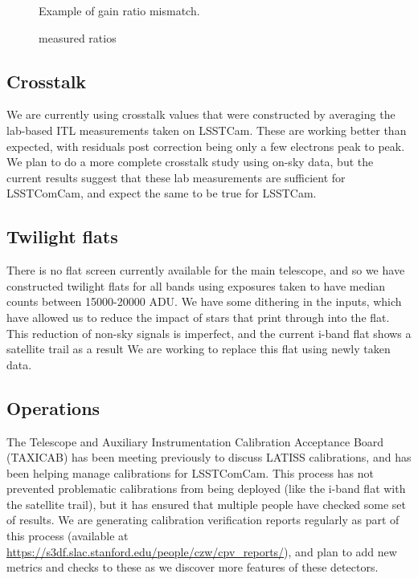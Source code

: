 \begin{figure}
  \caption{Example of gain ratio mismatch.}
\end{figure}

\begin{figure}
  \caption{measured ratios}
\end{figure}

\subsection{Crosstalk}

We are currently using crosstalk values that were constructed by averaging the lab-based ITL measurements taken on LSSTCam.
These are working better than expected, with residuals post correction being only a few electrons peak to peak.
We plan to do a more complete crosstalk study using on-sky data, but the current results suggest that these lab measurements are sufficient for LSSTComCam, and expect the same to be true for LSSTCam.

\subsection{Twilight flats}

There is no flat screen currently available for the main telescope, and so we have constructed twilight flats for all bands using exposures taken to have median counts between 15000-20000 ADU.
We have some dithering in the inputs, which have allowed us to reduce the impact of stars that print through into the flat.
This reduction of non-sky signals is imperfect, and the current i-band flat shows a satellite trail as a result
We are working to replace this flat using newly taken data.

\subsection{Operations}

The Telescope and Auxiliary Instrumentation Calibration Acceptance Board (TAXICAB) has been meeting previously to discuss LATISS calibrations, and has been helping manage calibrations for LSSTComCam.
This process has not prevented problematic calibrations from being deployed (like the i-band flat with the satellite trail), but it has ensured that multiple people have checked some set of results.
We are generating calibration verification reports regularly as part of this process (available at \url{https://s3df.slac.stanford.edu/people/czw/cpv_reports/}), and plan to add new metrics and checks to these as we discover more features of these detectors.
